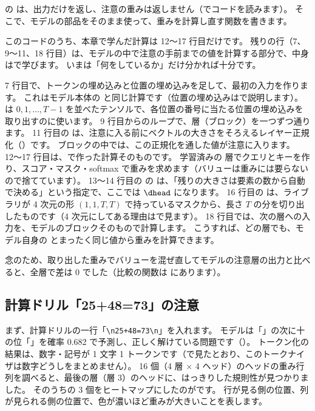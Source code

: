  の  は、出力だけを返し、注意の重みは返しません（でコードを読みます）。
そこで、モデルの部品をそのまま使って、重みを計算し直す関数を書きます。


このコードのうち、本章で学んだ計算は 12〜17 行目だけです。
残りの行（7、9〜11、18 行目）は、モデルの中で注意の手前までの値を計算する部分で、中身はで学びます。
いまは「何をしているか」だけ分かれば十分です。

7 行目で、トークンの埋め込みと位置の埋め込みを足して、最初の入力を作ります。
これはモデル本体の  と同じ計算です（位置の埋め込みはで説明します）。
 は $0,1,\dots,T-1$ を並べたテンソルで、各位置の番号に当たる位置の埋め込みを取り出すのに使います。
9 行目からのループで、層（ブロック）を一つずつ通ります。
11 行目の  は、注意に入る前にベクトルの大きさをそろえるレイヤー正規化（）です。
ブロックの中では、この正規化を通した値が注意に入ります。
12〜17 行目は、で作った計算そのものです。
学習済みの  層でクエリとキーを作り、スコア・マスク・softmax で重みを求めます（バリューは重みには要らないので捨てています）。
13〜14 行目の  の  は、「残りの大きさは要素の数から自動で決める」という指定で、ここでは $\dhead$ になります。
16 行目の  は、ライブラリが 4 次元の形 $(1,1,T,T)$ で持っているマスクから、長さ $T$ の分を切り出したものです（4 次元にしてある理由はで見ます）。
18 行目では、次の層への入力を、モデルのブロックそのもので計算します。
こうすれば、どの層でも、モデル自身の  とまったく同じ値から重みを計算できます。

念のため、取り出した重みでバリューを混ぜ直してモデルの注意層の出力と比べると、全層で差は 0 でした（比較の関数は  にあります）。

\subsection*{計算ドリル「25+48=73」の注意}

まず、計算ドリルの一行「\texttt{\textbackslash n25+48=73\textbackslash n}」を入れます。
モデルは「\code{=}」の次に十の位「」を確率 0.682 で予測し、正しく解けている問題です（）。
トークン化の結果は、数字・記号が 1 文字 1 トークンです（で見たとおり、このトークナイザは数字どうしをまとめません）。
16 個（4 層 × 4 ヘッド）のヘッドの重み行列を調べると、最後の層（層 3）のヘッドに、はっきりした規則性が見つかりました。
そのうちの 3 個をヒートマップにしたのがです。
行が見る側の位置、列が見られる側の位置で、色が濃いほど重みが大きいことを表します。

